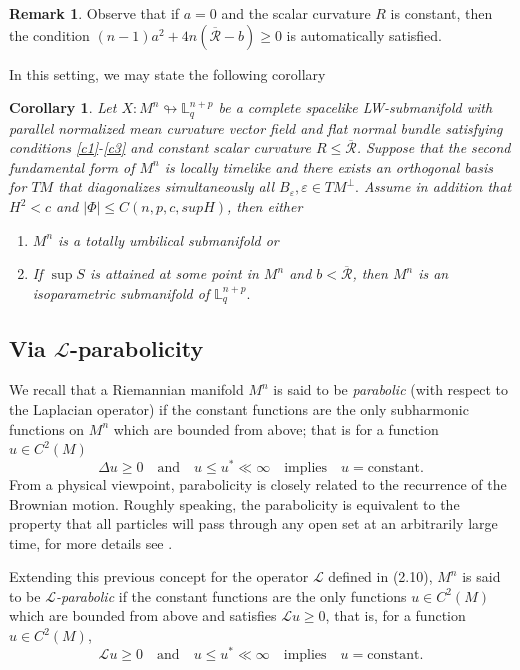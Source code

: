 \documentclass[leqno,11pt]{amsart}
\theoremstyle{plain}
\newtheorem{corollary}[theorem]{\indent\sc Corollary}
\theoremstyle{definition}
\newtheorem{remark}[theorem]{\indent\sc Remark}
\numberwithin{equation}{section}
\begin{document}
\begin{remark}
Observe that if $a = 0$ and the scalar curvature $R$ is constant, then the condition
$
(n-1)a^2 + 4n(\overline{\mathcal{R}} - b) \geq 0
$
is automatically satisfied.
\end{remark}

In this setting, we may state the following corollary

\begin{corollary}

Let $X:M^n\looparrowright \mathbb{L}^{n+p}_{q}$ be a complete spacelike LW-submanifold with parallel normalized mean curvature vector field and flat normal bundle satisfying conditions \eqref{c1}-\eqref{c3} and constant scalar curvature $R\leq \overline{\mathcal{R}}$. Suppose that the second fundamental form of $M^n$ is locally timelike and there exists an orthogonal basis for $TM$ that diagonalizes simultaneously all $B_{\varepsilon}, \varepsilon\in TM^{\perp}.$ Assume in addition that $H^2<c$ and $|\Phi|\leq C(n,p,c,supH)$, then either
\begin{enumerate}
    \item[(i)] $M^n$ is a totally umbilical submanifold or
    \item[(ii)] If $\sup S$ is attained at some point in $M^n$ and $b<\overline{\mathcal{R}}$, then $M^n$ is an isoparametric submanifold of $\mathbb{L}_{q}^{n+p}.$
\end{enumerate} 

\end{corollary}


\subsection{Via $\mathcal{L}$-parabolicity}

We recall that a Riemannian manifold $M^n$ is said to be \emph{parabolic} (with respect to the Laplacian operator) if the constant functions are the only subharmonic functions on $M^n$ which are bounded from above; that is for a function $u \in C^2(M)$
$$
\Delta u \geq 0 \quad \text{and} \quad u \leq u^* \ll \infty \quad \text{implies} \quad u = \text{constant}.
$$
From a physical viewpoint, parabolicity is closely related to the recurrence of the Brownian motion. Roughly speaking, the parabolicity is equivalent to the property that all particles will pass through any open set at an arbitrarily large time, for more details see \cite{grigorian:99}.

Extending this previous concept for the operator $\mathcal{L}$ defined in (2.10), $M^n$ is said to be \emph{$\mathcal{L}$-parabolic} if the constant functions are the only functions $u \in C^2(M)$ which are bounded from above and satisfies $\mathcal{L}u \geq 0$, that is, for a function $u \in C^2(M)$,
$$
\mathcal{L}u \geq 0 \quad \text{and} \quad u \leq u^* \ll \infty \quad \text{implies} \quad u = \text{constant}.
$$
\end{document}
